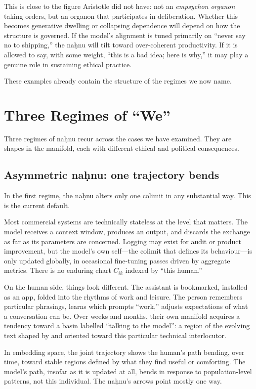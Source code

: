 \documentclass[12pt,a4paper]{article}
\begin{document}
This is close to the figure Aristotle did not have: not an \emph{empsychon organon} taking orders, but an organon that participates in deliberation. Whether this becomes generative dwelling or collapsing dependence will depend on how the structure is governed. If the model's alignment is tuned primarily on ``never say no to shipping,'' the na\d{h}nu will tilt toward over-coherent productivity. If it is allowed to say, with some weight, ``this is a bad idea; here is why,'' it may play a genuine role in sustaining ethical practice.

These examples already contain the structure of the regimes we now name.

\section{Three Regimes of ``We''}

Three regimes of na\d{h}nu recur across the cases we have examined. They are shapes in the manifold, each with different ethical and political consequences.

\subsection{Asymmetric na\d{h}nu: one trajectory bends}

In the first regime, the na\d{h}nu alters only one colimit in any substantial way. This is the current default.

Most commercial systems are technically stateless at the level that matters. The model receives a context window, produces an output, and discards the exchange as far as its parameters are concerned. Logging may exist for audit or product improvement, but the model's own self---the colimit that defines its behaviour---is only updated globally, in occasional fine-tuning passes driven by aggregate metrics. There is no enduring chart $C_{ik}$ indexed by ``this human.''

On the human side, things look different. The assistant is bookmarked, installed as an app, folded into the rhythms of work and leisure. The person remembers particular phrasings, learns which prompts ``work,'' adjusts expectations of what a conversation can be. Over weeks and months, their own manifold acquires a tendency toward a basin labelled ``talking to the model'': a region of the evolving text shaped by and oriented toward this particular technical interlocutor.

In embedding space, the joint trajectory shows the human's path bending, over time, toward stable regions defined by what they find useful or comforting. The model's path, insofar as it is updated at all, bends in response to population-level patterns, not this individual. The na\d{h}nu's arrows point mostly one way.
\end{document}
